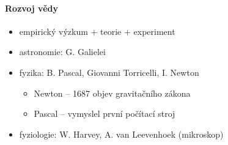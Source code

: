 \paragraph{Rozvoj vědy}
\begin{itemize}
\item empirický výzkum + teorie + experiment
\item astronomie: G. Galielei
\item fyzika: B. Pascal, Giovanni Torricelli, I. Newton
	\begin{itemize}
	\item Newton -- 1687 objev gravitačního zákona
	\item Pascal -- vymyslel první počítací stroj
	\end{itemize}
\item fyziologie: W. Harvey, A. van Leevenhoek (mikroskop)
\end{itemize}

